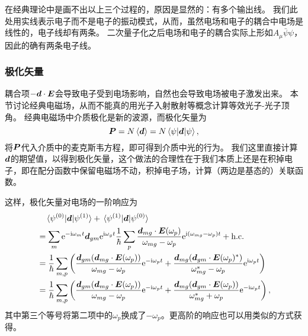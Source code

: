 在经典理论中是画不出以上三个过程的，原因是显然的：有多个输出线。
我们此处用实线表示电子而不是电子的振动模式，从而，虽然电场和电子的耦合中电场是线性的，电子线却有两条。
二次量子化之后电场和电子的耦合实际上形如$A_\mu \bar{\psi} \psi$，因此的确有两条电子线。

\subsubsection{极化矢量}

耦合项$- \vb*{d} \cdot \vb*{E}$会导致电子受到电场影响，自然也会导致电场被电子激发出来。
本节讨论经典电磁场，从而不能真的用光子入射散射等概念计算等效光子-光子顶角。
经典电磁场中介质极化是新的波源，而极化矢量为
\begin{equation}
    \vb*{P} = N \expval*{\vb*{d}} = N \mel*{\psi}{\vb*{d}}{\psi},
\end{equation}
将$\vb*{P}$代入介质中的麦克斯韦方程，即可得到介质中光的行为。
我们这里直接计算$\vb*{d}$的期望值，以得到极化矢量，这个做法的合理性在于我们本质上还是在积掉电子，即在配分函数中保留电磁场不动，积掉电子场，计算（两边是基态的）关联函数。

这样，极化矢量对电场的一阶响应为
\begin{equation}
   \begin{aligned}
    &\quad \mel*{\psi^{(0)}}{\vb*{d}}{\psi^{(1)}} + \mel*{\psi^{(1)}}{\vb*{d}}{\psi^{(0)}} \\
    &= \sum_m \mathrm{e}^{- \mathrm{i} \omega_m t} \vb*{d}_{gm} \mathrm{e}^{\mathrm{i} \omega_g t} \frac{1}{\hbar} \sum_p \frac{\vb*{d}_{mg} \cdot \vb*{E}(\omega_p)}{\omega_{mg} - \omega_p} \mathrm{e}^{\mathrm{i} (\omega_{mg} - \omega_p) t} + \text{h.c.} \\
    &= \frac{1}{\hbar} \sum_{m, p} \left( \frac{ \vb*{d}_{gm} (\vb*{d}_{mg} \cdot \vb*{E}(\omega_p))}{\omega_{mg} - \omega_p} \mathrm{e}^{- \mathrm{i} \omega_p t} + \frac{ \vb*{d}_{mg} (\vb*{d}_{gm} \cdot \vb*{E}(\omega_p)^* )}{\omega_{mg}^* - \omega_p} \mathrm{e}^{\mathrm{i} \omega_p t} \right) \\
    &= \frac{1}{\hbar} \sum_{m, p} \left( \frac{ \vb*{d}_{gm} (\vb*{d}_{mg} \cdot \vb*{E}(\omega_p))}{\omega_{mg} - \omega_p} \mathrm{e}^{- \mathrm{i} \omega_p t} + \frac{ \vb*{d}_{mg} (\vb*{d}_{gm} \cdot \vb*{E}(\omega_p) )}{\omega_{mg}^* + \omega_p} \mathrm{e}^{- \mathrm{i} \omega_p t} \right), 
   \end{aligned} 
   \label{eq:dipole-first-perturbation}
\end{equation}
其中第三个等号将第二项中的$\omega_p$换成了$-\omega_p$。更高阶的响应也可以用类似的方式获得。

